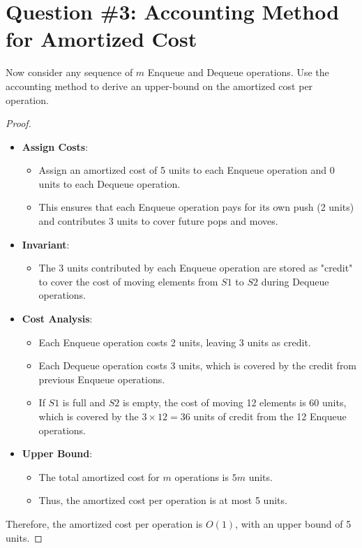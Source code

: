 \documentclass[12pt]{article}
\begin{document}
\section*{Question \#3: Accounting Method for Amortized Cost}
Now consider any sequence of \( m \) Enqueue and Dequeue operations. Use the accounting method to derive an upper-bound on the amortized cost per operation.

\begin{proof}
\leavevmode\\
\begin{itemize}
    \item \textbf{Assign Costs}:
    \begin{itemize}
        \item Assign an amortized cost of 5 units to each Enqueue operation and 0 units to each Dequeue operation.
        \item This ensures that each Enqueue operation pays for its own push (2 units) and contributes 3 units to cover future pops and moves.
    \end{itemize}

    \item \textbf{Invariant}:
    \begin{itemize}
        \item The 3 units contributed by each Enqueue operation are stored as "credit" to cover the cost of moving elements from \( S1 \) to \( S2 \) during Dequeue operations.
    \end{itemize}

    \item \textbf{Cost Analysis}:
    \begin{itemize}
        \item Each Enqueue operation costs 2 units, leaving 3 units as credit.
        \item Each Dequeue operation costs 3 units, which is covered by the credit from previous Enqueue operations.
        \item If \( S1 \) is full and \( S2 \) is empty, the cost of moving 12 elements is \( 60 \) units, which is covered by the \( 3 \times 12 = 36 \) units of credit from the 12 Enqueue operations.
    \end{itemize}

    \item \textbf{Upper Bound}:
    \begin{itemize}
        \item The total amortized cost for \( m \) operations is \( 5m \) units.
        \item Thus, the amortized cost per operation is at most 5 units.
    \end{itemize}
\end{itemize}

Therefore, the amortized cost per operation is \( O(1) \), with an upper bound of 5 units.
\end{proof}
\pagebreak
\end{document}

